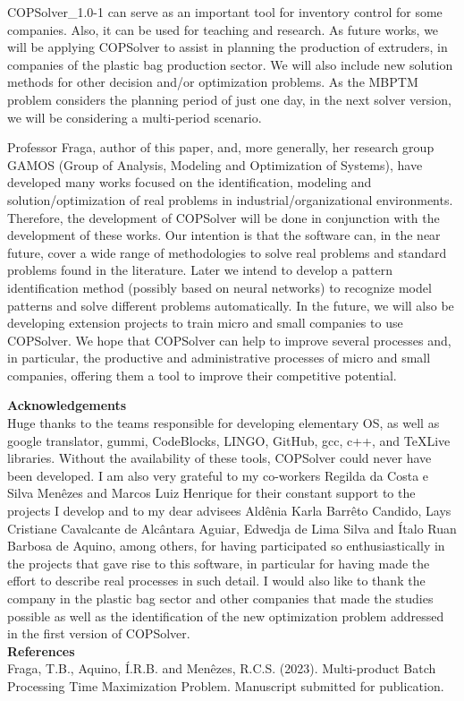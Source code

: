 \documentclass[11pt, letterpaper]{article}
\begin{document}
COPSolver\_1.0-1 can serve as an important tool for inventory control for some companies. Also, it can be used for teaching and research. As future works, we will be applying COPSolver to assist in planning the production of extruders, in companies of the plastic bag production sector. We will also include new solution methods for other decision and/or optimization problems. As the MBPTM problem considers the planning period of just one day, in the next solver version, we will be considering a multi-period scenario.

Professor Fraga, author of this paper, and, more generally, her research group GAMOS (Group of Analysis, Modeling and Optimization of Systems), have developed many works focused on the identification, modeling and solution/optimization of real problems in industrial/organizational environments. Therefore, the development of COPSolver will be done in conjunction with the development of these works. Our intention is that the software can, in the near future, cover a wide range of methodologies to solve real problems and standard problems found in the literature. Later we intend to develop a pattern identification method (possibly based on neural networks) to recognize model patterns and solve different problems automatically. In the future, we will also be developing extension projects to train micro and small companies to use COPSolver. We hope that COPSolver can help to improve several processes and, in particular, the productive and administrative processes of micro and small companies, offering them a tool to improve their competitive potential.

\vskip0.3cm
\noindent
\textbf{Acknowledgements}\\
Huge thanks to the teams responsible for developing elementary OS, as well as google translator, gummi, CodeBlocks, LINGO, GitHub, gcc, c++, and TeXLive libraries. Without the availability of these tools, COPSolver could never have been developed. I am also very grateful to my co-workers Regilda da Costa e Silva Menêzes and Marcos Luiz Henrique for their constant support to the projects I develop and to my dear advisees Aldênia Karla Barrêto Candido, Lays Cristiane Cavalcante de Alcântara Aguiar, Edwedja de Lima Silva and Ítalo Ruan Barbosa de Aquino, among others, for having participated so enthusiastically in the projects that gave rise to this software, in particular for having made the effort to describe real processes in such detail. I would also like to thank the company in the plastic bag sector and other companies that made the studies possible as well as the identification of the new optimization problem addressed in the first version of COPSolver. \\

\noindent
\textbf{References}\\
Fraga, T.B., Aquino, Í.R.B. and Menêzes, R.C.S. (2023). Multi-product Batch Processing Time Maximization
Problem. Manuscript submitted for publication.  \\

\vskip 1.5cm
\end{document}
